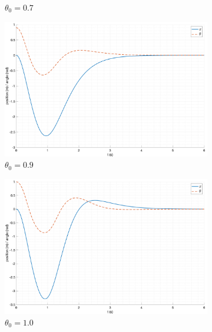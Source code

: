 \begin{figure}[ht!]
\begin{subfigure}[b]{0.45\textwidth}
        \caption{$\theta_0 = 0.7$}
    \end{subfigure}
    \begin{subfigure}[b]{0.45\textwidth}
        \includegraphics[width=\textwidth]{media/plots/modal_control/modal_control_out_3.png}
        \caption{$\theta_0 = 0.9$}
    \end{subfigure}
    \begin{subfigure}[b]{0.45\textwidth}
        \includegraphics[width=\textwidth]{media/plots/modal_control/modal_control_out_4.png}
        \caption{$\theta_0 = 1.0$}
    \end{subfigure}
    \begin{subfigure}[b]{0.45\textwidth}

\end{subfigure}
\end{figure}
